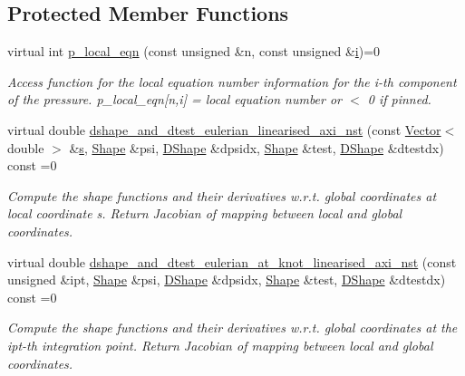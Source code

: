 \subsection*{Protected Member Functions}
\begin{DoxyCompactItemize}
\item 
virtual int \hyperlink{classoomph_1_1LinearisedAxisymmetricNavierStokesEquations_a78d4ea2b8f4d23f8e942dc7bcb3fa4c5}{p\+\_\+local\+\_\+eqn} (const unsigned \&n, const unsigned \&\hyperlink{cfortran_8h_adb50e893b86b3e55e751a42eab3cba82}{i})=0
\begin{DoxyCompactList}\small\item\em Access function for the local equation number information for the i-\/th component of the pressure. p\+\_\+local\+\_\+eqn\mbox{[}n,i\mbox{]} = local equation number or $<$ 0 if pinned. \end{DoxyCompactList}\item 
virtual double \hyperlink{classoomph_1_1LinearisedAxisymmetricNavierStokesEquations_a0c2247614d1d1414dc53cde8e755e836}{dshape\+\_\+and\+\_\+dtest\+\_\+eulerian\+\_\+linearised\+\_\+axi\+\_\+nst} (const \hyperlink{classoomph_1_1Vector}{Vector}$<$ double $>$ \&\hyperlink{cfortran_8h_ab7123126e4885ef647dd9c6e3807a21c}{s}, \hyperlink{classoomph_1_1Shape}{Shape} \&psi, \hyperlink{classoomph_1_1DShape}{D\+Shape} \&dpsidx, \hyperlink{classoomph_1_1Shape}{Shape} \&test, \hyperlink{classoomph_1_1DShape}{D\+Shape} \&dtestdx) const =0
\begin{DoxyCompactList}\small\item\em Compute the shape functions and their derivatives w.\+r.\+t. global coordinates at local coordinate s. Return Jacobian of mapping between local and global coordinates. \end{DoxyCompactList}\item 
virtual double \hyperlink{classoomph_1_1LinearisedAxisymmetricNavierStokesEquations_aa42c291276849d54300289506e8c365b}{dshape\+\_\+and\+\_\+dtest\+\_\+eulerian\+\_\+at\+\_\+knot\+\_\+linearised\+\_\+axi\+\_\+nst} (const unsigned \&ipt, \hyperlink{classoomph_1_1Shape}{Shape} \&psi, \hyperlink{classoomph_1_1DShape}{D\+Shape} \&dpsidx, \hyperlink{classoomph_1_1Shape}{Shape} \&test, \hyperlink{classoomph_1_1DShape}{D\+Shape} \&dtestdx) const =0
\begin{DoxyCompactList}\small\item\em Compute the shape functions and their derivatives w.\+r.\+t. global coordinates at the ipt-\/th integration point. Return Jacobian of mapping between local and global coordinates. \end{DoxyCompactList}\item 

\end{DoxyCompactItemize}
